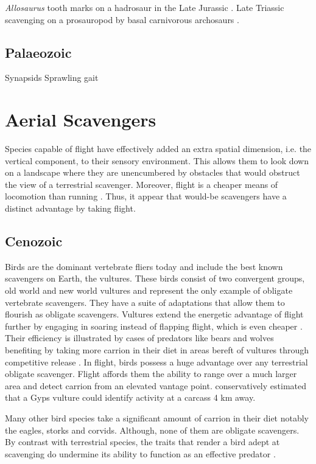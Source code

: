 \documentclass[a4paper,12pt]{article}
\begin{document}
\textit{Allosaurus} tooth marks on a hadrosaur in the Late Jurassic \citep{chure1997one}. 
Late Triassic scavenging on a prosauropod by basal carnivorous archosaurs \citep{hungerbuhler1998taphonomy}.

\subsection*{Palaeozoic}
Synapsids 
Sprawling gait



\section{Aerial Scavengers}
Species capable of flight have effectively added an extra spatial dimension, i.e. the vertical component, to their sensory environment.
This allows them to look down on a landscape where they are unencumbered by obstacles that would obstruct the view of a terrestrial scavenger.
Moreover, flight is a cheaper means of locomotion than running \citep{tucker1975energetic}. 
Thus, it appear that would-be scavengers have a distinct advantage by taking flight. 

\subsection*{Cenozoic}
Birds are the dominant vertebrate fliers today and include the best known scavengers on Earth, the vultures. 
These birds consist of two convergent groups, old world and new world vultures and represent the only example of obligate vertebrate scavengers. 
They have a suite of adaptations that allow them to flourish as obligate scavengers.
Vultures extend the energetic advantage of flight further by engaging in soaring instead of flapping flight, which is even cheaper \citep{hedenstrom1993migration}.
Their efficiency is illustrated by cases of predators like bears and wolves benefiting by taking more carrion in their diet in areas bereft of vultures through competitive release \citep{devault2003scavenging}. 
In flight, birds possess a huge advantage over any terrestrial obligate scavenger. 
Flight affords them the ability to range over a much larger area and detect carrion from an elevated vantage point.
\cite{pennycuick1972soaring} conservatively estimated that a Gyps vulture could identify activity at a carcass 4 km away. 

Many other bird species take a significant amount of carrion in their diet notably the eagles, storks and corvids. 
Although, none of them are obligate scavengers. 
By contrast with terrestrial species, the traits that render a bird adept at scavenging do undermine its ability to function as an effective predator \citep{devault2003scavenging}. 
\end{document}
